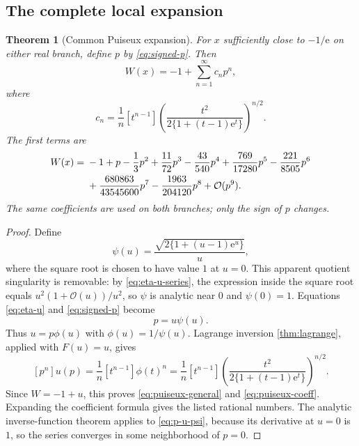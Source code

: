 \documentclass[11pt]{article}
\numberwithin{equation}{section}
\newtheorem{theorem}{Theorem}[section]
\theoremstyle{definition}
\theoremstyle{remark}
\newcommand{\e}{\mathrm e}
\begin{document}
\subsection{The complete local expansion}

\begin{theorem}[Common Puiseux expansion]
\label{thm:puiseux}
For $x$ sufficiently close to $-1/\e$ on either real branch, define $p$ by
\eqref{eq:signed-p}.  Then
\begin{equation}
 W(x)=-1+\sum_{n=1}^{\infty}c_n p^n,                  \label{eq:puiseux-general}
\end{equation}
where
\begin{equation}
 c_n=\frac1n[t^{n-1}]
 \left(\frac{t^2}{2\{1+(t-1)\e^t\}}\right)^{n/2}.    \label{eq:puiseux-coeff}
\end{equation}
The first terms are
\begin{align}
 W(x)={}&-1+p-\frac13p^2+\frac{11}{72}p^3
 -\frac{43}{540}p^4+\frac{769}{17280}p^5
 -\frac{221}{8505}p^6 \notag\\
 &+\frac{680863}{43545600}p^7
 -\frac{1963}{204120}p^8+\mathcal O(p^9).             \label{eq:puiseux-first}
\end{align}
The same coefficients are used on both branches; only the sign of $p$ changes.
\end{theorem}

\begin{proof}
Define
\[
 \psi(u)=\frac{\sqrt{2\{1+(u-1)\e^u\}}}{u},
\]
where the square root is chosen to have value $1$ at $u=0$.  This apparent
quotient singularity is removable: by \eqref{eq:eta-u-series}, the expression
inside the square root equals $u^2(1+\mathcal O(u))/u^2$, so $\psi$ is analytic
near $0$ and $\psi(0)=1$.  Equations \eqref{eq:eta-u} and
\eqref{eq:signed-p} become
\begin{equation}
  p=u\psi(u).                                          \label{eq:p-u-psi}
\end{equation}
Thus $u=p\phi(u)$ with $\phi(u)=1/\psi(u)$.  Lagrange inversion
\cref{thm:lagrange}, applied with $F(u)=u$, gives
\[
 [p^n]u(p)=\frac1n[t^{n-1}]\phi(t)^n
 =\frac1n[t^{n-1}]
   \left(\frac{t^2}{2\{1+(t-1)\e^t\}}\right)^{n/2}.
\]
Since $W=-1+u$, this proves \eqref{eq:puiseux-general} and
\eqref{eq:puiseux-coeff}.  Expanding the coefficient formula gives the listed
rational numbers.  The analytic inverse-function theorem applies to
\eqref{eq:p-u-psi}, because its derivative at $u=0$ is $1$, so the series
converges in some neighborhood of $p=0$.
\end{proof}
\end{document}
